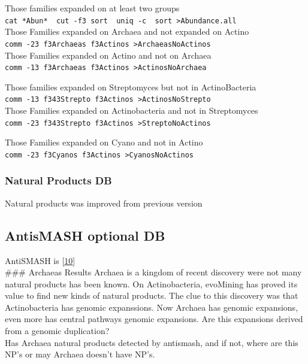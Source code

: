 \documentclass[12pt,twoside]{reedthesis}
\begin{document}
  Those families expanded on at least two groups\\
  \texttt{cat\ *Abun*\ \textbar{}\ cut\ -f3\textbar{}\ sort\ \textbar{}\ uniq\ -c\ \textbar{}\ sort\ \textgreater{}Abundance.all}\\
  
  Those Families expanded on Archaea and not expanded on Actino\\
  \texttt{comm\ -23\ f3Archaeas\ f3Actinos\ \textgreater{}ArchaeasNoActinos}\\
  Those Families expanded on Actino and not on Archaea\\
  \texttt{comm\ -13\ f3Archaeas\ f3Actinos\ \textgreater{}ActinosNoArchaea}
  
  Those families expanded on Streptomyces but not in ActinoBacteria\\
  \texttt{comm\ -13\ f343Strepto\ f3Actinos\ \textgreater{}ActinosNoStrepto}\\
  Those Families expanded on Actinobacteria and not in Streptomyces\\
  \texttt{comm\ -23\ f343Strepto\ f3Actinos\ \textgreater{}StreptoNoActinos}
  
  Those Families expanded on Cyano and not in Actino\\
  \texttt{comm\ -23\ f3Cyanos\ f3Actinos\ \textgreater{}CyanosNoActinos}
  
  \subsubsection{Natural Products DB}\label{natural-products-db}
  
  Natural products was improved from previous version
  
  \subsection{AntisMASH optional DB}\label{antismash-optional-db}
  
  AntiSMASH is {[}\protect\hyperlink{ref-weber_antismash_2015}{10}{]}\\
  \#\#\# Archaeas Results Archaea is a kingdom of recent discovery were
  not many natural products has been known. On Actinobacteria, evoMining
  has proved its value to find new kinds of natural products. The clue to
  this discovery was that Actinobacteria has genomic expanssions. Now
  Archaea has genomic expansions, even more has central pathways genomic
  expansions. Are this expansions derived from a genomic duplication?\\
  Has Archaea natural products detected by antismash, and if not, where
  are this NP's or may Archaea doesn't have NP's.
  
\end{document}
